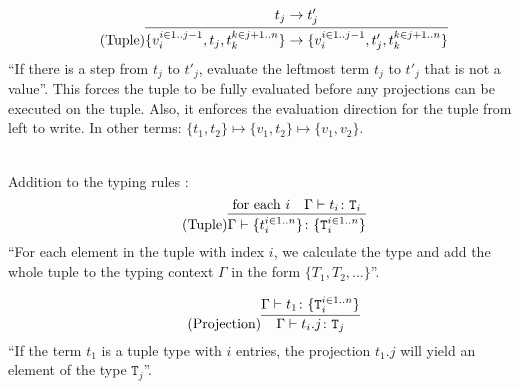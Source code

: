 \begin{equation*}
    \tag{Tuple}
    \infer{
    \{v_i^{i \in 1..j-1}, t_j, t_k^{k \in j+1..n}\} \rightarrow \{v_i^{i \in 1..j-1}, t'_j, t_k^{k \in j+1..n}\}
    }{
    t_j \rightarrow t'_j
    }
\end{equation*}
``If there is a step from $t_j$ to $t'_j$, evaluate the leftmost
term $t_j$ to $t'_j$ that is not a value''. This forces the tuple to
be fully evaluated before any projections can be executed on the tuple.
Also, it enforces the evaluation direction for the tuple from left to write.
In other terms: $\{t_1, t_2\} \mapsto \{v_1, t_2\} \mapsto \{v_1, v_2\}$.

~\\
Addition to the typing rules \cite{pierce2002ProgLang}:
\begin{equation*}
    \tag{Tuple}
    \infer{
    \Gamma \vdash \{t_i^{i \in 1..n}\} \colon \{\texttt{T}_i^{i \in 1..n}\}
    }{
    \text{for each } i & \Gamma \vdash t_i \colon \texttt{T}_i
    }
\end{equation*}
``For each element in the tuple with index $i$, we calculate the type
and add the whole tuple to the typing context $\Gamma$ in the form $\{T_1, T_2, \dots\}$''.

\begin{equation*}
    \tag{Projection}
    \infer{
    \Gamma \vdash t_i . j \colon \texttt{T}_j
    }{
    \Gamma \vdash t_1 \colon \{\texttt{T}_i^{i \in 1..n}\}
    }
\end{equation*}
``If the term $t_1$ is a tuple type with $i$ entries, the projection
$t_1 . j$ will yield an element of the type $\texttt{T}_j$''.
